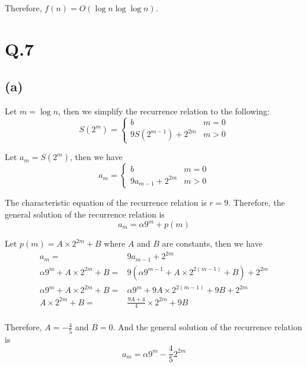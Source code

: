 \documentclass[a4paper,12pt]{article}
\begin{document}
Therefore, $f(n) = O(\log n \log \log n)$.


\section*{Q.7}

\subsection*{(a)}

Let $m = \log n$, then we simplify the recurrence relation to the following:
\begin{equation*}
	S(2^m) =
	\begin{cases}
		b & m = 0 \\
		9S(2^{m-1}) + 2^{2m} & m > 0
	\end{cases}
\end{equation*}

Let $a_m = S(2^m)$, then we have
\begin{equation*}
	a_m =
	\begin{cases}
		b & m = 0 \\
		9a_{m-1} + 2^{2m} & m > 0
	\end{cases}
\end{equation*}

The characteristic equation of the recurrence relation is $r = 9$.
Therefore, the general solution of the recurrence relation is
\begin{equation*}
	a_m = \alpha 9^m + p(m) 
\end{equation*}

Let $p(m) = A \times 2^{2m} + B$ where $A$ and $B$ are constants, then we have
\begin{align*}
	a_m =& 9a_{m-1} + 2^{2m} \\
	\alpha 9^m + A \times 2^{2m} + B =& 9(\alpha 9^{m-1} + A \times 2^{2(m-1)} + B) + 2^{2m} \\
	\alpha 9^m + A \times 2^{2m} + B =& \alpha 9^m + 9A \times 2^{2(m-1)} + 9B + 2^{2m} \\
	A \times 2^{2m} + B =& \frac{9A + 4}{4} \times 2^{2m} + 9B \\
\end{align*}

Therefore, $A = -\frac{4}{5}$ and $B = 0$.
And the general solution of the recurrence relation is
\begin{equation*}
	a_m = \alpha 9^m - \frac{4}{5} 2^{2m}
\end{equation*}
\end{document}
